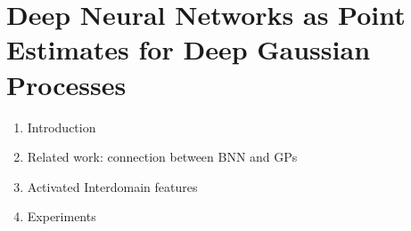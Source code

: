 \chapter{Deep Neural Networks as Point Estimates for Deep Gaussian Processes}

\begin{enumerate}
    \item Introduction
    \item Related work: connection between BNN and GPs
    \item Activated Interdomain features
    \item Experiments
\end{enumerate}